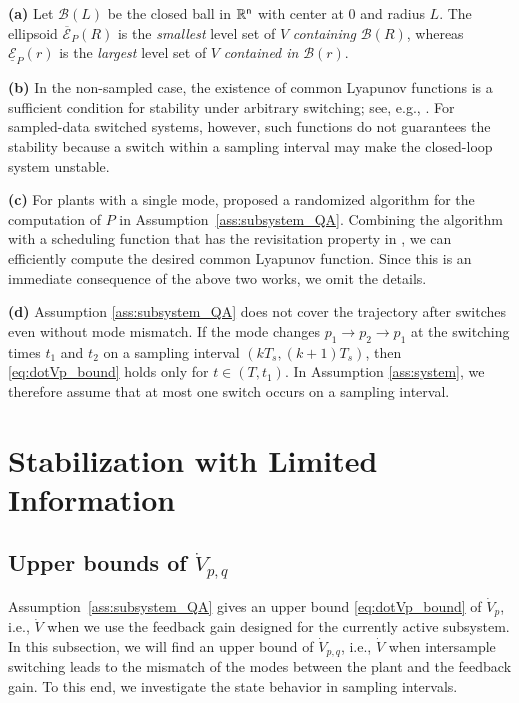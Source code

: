 \documentclass[a4, 11pt]{article}
\begin{document}
\begin{remark}
{\bf (a)}
Let $\mathcal{B}(L)$ be
the closed ball in $\mathbb{R}^{\sf n}$ with center at 0 and radius $L$. 
The ellipsoid $\overline{\mathcal{E}}_P(R)$ is the \textit{smallest} level set of $V$
\textit{containing} $\mathcal{B}(R)$, whereas $\underline{\mathcal{E}}_P(r)$ is
the \textit{largest} level set of $V$ \textit{contained in} $\mathcal{B}(r)$. 

\noindent
{\bf (b)}
In the non-sampled case,
the existence of common Lyapunov functions is a sufficient condition 
for stability under arbitrary switching; see, e.g., \cite{Liberzon2003Book, Lin2009}.
For sampled-data switched systems, however,
such functions do not guarantees the stability because
a switch within a sampling interval may make the closed-loop system unstable. 

\noindent
{\bf (c)}
For plants with a single mode,
\cite{Ishii2004}
proposed a randomized algorithm for the computation of $P$ in 
Assumption~\ref{ass:subsystem_QA}.
Combining the algorithm with a scheduling function that has the 
revisitation property in \cite{Liberzon2004},
we can efficiently compute the desired common Lyapunov function.
Since this is an immediate consequence of the above two works,
we omit the details.

\noindent
{\bf (d)}
Assumption \ref{ass:subsystem_QA} does not cover
the trajectory after switches even without mode mismatch.
If the mode changes $p_1 \to p_2 \to p_1$ 
at the switching times $t_1$ and $t_2$ 
on a sampling interval $(kT_s, (k+1)T_s)$,
then \eqref{eq:dotVp_bound} holds only for $t \in (T,t_1)$.
In Assumption \ref{ass:system}, we therefore assume that 
at most one switch occurs on
a sampling interval.
\end{remark}




\section{Stabilization with Limited Information}
\subsection{Upper bounds of $\dot V_{p,q}$}
Assumption~\ref{ass:subsystem_QA} gives an upper bound \eqref{eq:dotVp_bound}
of $\dot V_{p}$, i.e., $\dot V$ when we use the feedback gain designed for
the currently active subsystem. 
In this subsection,
we will
find an upper bound of $\dot V_{p,q}$, i.e.,
$\dot V$ when intersample switching leads to the
mismatch of the modes between the plant and the feedback gain.
To this end, we investigate the state behavior in sampling intervals.
\end{document}
